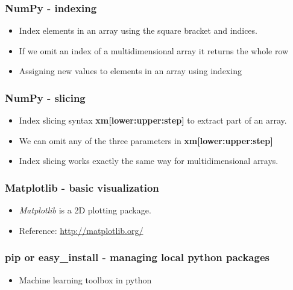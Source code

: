 \documentclass[11pt]{beamer}
\begin{document}
%
\begin{frame}[plain]
    \frametitle{NumPy - indexing}
    \begin{itemize}
        \item[] Index elements in an array using the square bracket and indices. 
        
        
        \item[] If we omit an index of a multidimensional array it returns the whole row
        
        \item[] Assigning new values to elements in an array using indexing
        
    \end{itemize}
\end{frame}
%
\begin{frame}[plain]
    \frametitle{NumPy - slicing}
    \begin{itemize}
        \item[] Index slicing syntax \textbf{xm[lower:upper:step]} to extract part of an array. 
        
        \item[] We can omit any of the three parameters in \textbf{xm[lower:upper:step]}
        
        \item[] Index slicing works exactly the same way for multidimensional arrays.
        
    \end{itemize}
\end{frame}
%
\begin{frame}[plain]
    \frametitle{Matplotlib - basic visualization}
    \begin{itemize}
        \item[] \textit{Matplotlib} is a 2D plotting package.  
        
        
        \item[] Reference: \url{http://matplotlib.org/}
    \end{itemize}
\end{frame}
%
\begin{frame}[plain]
    \frametitle{pip or easy\_install - managing local python packages}
    \begin{itemize}
        \item[] Machine learning toolbox in python
    \end{itemize}
\end{frame}
\end{document}
